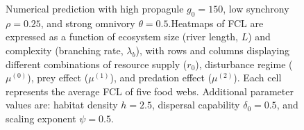 \begin{figure}
\centering
{}
\caption{\label{fig:fig-num6}Numerical prediction with high propagule
\(g_0 = 150\), low synchrony \(\rho = 0.25\), and strong omnivory
\(\theta = 0.5\).Heatmaps of FCL are expressed as a function of
ecosystem size (river length, \(L\)) and complexity (branching rate,
\(\lambda_b\)), with rows and columns displaying different combinations
of resource supply (\(r_0\)), disturbance regime (\(\mu^{(0)}\)), prey
effect (\(\mu^{(1)}\)), and predation effect (\(\mu^{(2)}\)). Each cell
represents the average FCL of five food webs. Additional parameter
values are: habitat density \(h=2.5\), dispersal capability
\(\delta_0=0.5\), and scaling exponent \(\psi=0.5\).}
\end{figure}

\newpage

